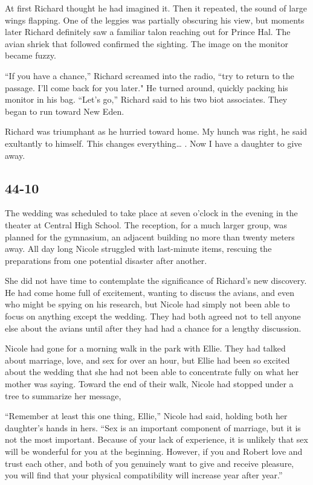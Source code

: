 \documentclass[]{article}
\begin{document}
{At first Richard thought he had imagined it.  Then it repeated, the sound of large wings flapping.  One of the leggies was partially obscuring his view, but moments later Richard definitely saw a familiar talon reaching out for Prince Hal.  The avian shriek that followed confirmed the sighting.  The image on the monitor became fuzzy.

“If you have a chance,” Richard screamed into the radio, “try to return to the passage.  I’ll come back for you later."  He turned around, quickly packing his monitor in his bag.  “Let’s go,” Richard said to his two biot associates.  They began to run toward New Eden.

Richard was triumphant as he hurried toward home.  My hunch was right, he said exultantly to himself.  This changes everything… .  Now I have a daughter to give away.


\subsection*{44-10}

The wedding was scheduled to take place at seven o’clock in the evening in the theater at Central High School.  The reception, for a much larger group, was planned for the gymnasium, an adjacent building no more than twenty meters away.  All day long Nicole struggled with last-minute items, rescuing the preparations from one potential disaster after another.

She did not have time to contemplate the significance of Richard’s new discovery.  He had come home full of excitement, wanting to discuss the avians, and even who might be spying on his research, but Nicole had simply not been able to focus on anything except the wedding.  They had both agreed not to tell anyone else about the avians until after they had had a chance for a lengthy discussion.

Nicole had gone for a morning walk in the park with Ellie.  They had talked about marriage, love, and sex for over an hour, but Ellie had been so excited about the wedding that she had not been able to concentrate fully on what her mother was saying.  Toward the end of their walk, Nicole had stopped under a tree to summarize her message,

“Remember at least this one thing, Ellie,” Nicole had said, holding both her daughter’s hands in hers.  “Sex is an important component of marriage, but it is not the most important.  Because of your lack of experience, it is unlikely that sex will be wonderful for you at the beginning.  However, if you and Robert love and trust each other, and both of you genuinely want to give and receive pleasure, you will find that your physical compatibility will increase year after year.”

}
\end{document}
